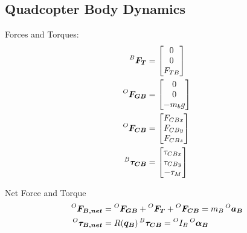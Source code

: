 \subsection{Quadcopter Body Dynamics}
Forces and Torques:
\begin{align*}
  \prescript{B}{}{\bm{F_{T}}} &=
  \begin{bmatrix}
    0 \\ 0 \\ F_{TB}
  \end{bmatrix} \\
  \prescript{O}{}{\bm{F_{GB}}} &=
  \begin{bmatrix}
    0 \\ 0 \\ -m_b g
  \end{bmatrix} \\
  \prescript{O}{}{\bm{F_{CB}}} &=
  \begin{bmatrix}
    F_{CBx} \\ F_{CBy} \\ F_{CBz} 
  \end{bmatrix} \\
  \prescript{B}{}{\bm{\tau_{CB}}} &=
  \begin{bmatrix}
    \tau_{CBx} \\ \tau_{CBy} \\ -\tau_{M} 
  \end{bmatrix}
\end{align*}

Net Force and Torque
\begin{align}
  \prescript{O}{}{\bm{F_{B, net}}} &= \prescript{O}{}{\bm{F_{GB}}} + \prescript{O}{}{\bm{F_{T}}} + \prescript{O}{}{\bm{F_{CB}}} = m_B \prescript{O}{}{\bm{a_B}} \\
  \prescript{O}{}{\bm{\tau_{B, net}}} &= R(\bm{q_B})\prescript{B}{}{\bm{\tau_{CB}}} = \prescript{O}{}{I_B} \prescript{O}{}{\bm{\alpha_B}}
\end{align}

